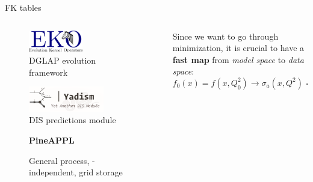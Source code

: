 \documentclass[9pt]{beamer}
\begin{document}
\begin{frame}{FK tables}
    \vspace*{20pt}
    \begin{columns}
        \begin{column}{0.5\textwidth}
            \begin{figure}
                \centering
                \includegraphics[width=0.5\textwidth]{eko}
                \caption*{DGLAP evolution framework}
            \end{figure}
            \vspace*{5pt}

            \begin{figure}
                \includegraphics[width=0.7\textwidth]{yadism}
                \caption*{DIS predictions module}
            \end{figure}
            \vspace*{20pt}

            \begin{figure}
                {\Huge \textbf{PineAPPL}}
                \caption*{General process, \pdf-independent, grid storage}
            \end{figure}
        \end{column}
        \begin{column}{0.5\textwidth}
            Since we want to go through minimization, it is crucial to have a
            \textbf{fast map} from \textit{model space} to \textit{data space}:
            \begin{equation*}
                f_0(x) = f(x, Q_0^2) \to \sigma_a(x, Q^2) = \hat{\sigma}_a(Q^2)
                \otimes f(Q^2) \otimes f(Q^2)
            \end{equation*}
            \vspace*{5pt}


\end{column}
\end{columns}
\end{frame}
\end{document}
